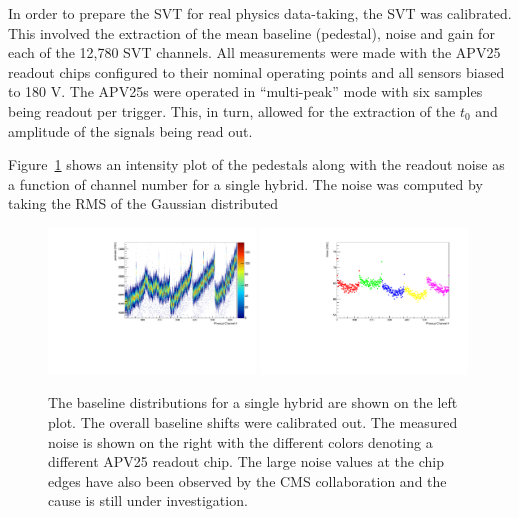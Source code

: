 
%
%

In order to prepare the SVT for real physics data-taking, the SVT was 
calibrated. This involved the extraction of the mean baseline (pedestal),
noise and gain for each of the 12,780 SVT channels. All measurements
were made with the APV25 readout chips configured to their nominal operating
points \cite{Jones:1069892} and all sensors biased to 180 V. The APV25s were
operated in ``multi-peak'' mode with six samples being readout per trigger.
This, in turn, allowed for the extraction of the $t_0$ and amplitude of the 
signals being read out.

Figure~\ref{fig:pedestal_noise} shows an intensity plot of the pedestals 
along with the readout noise as a function of channel number for a single
hybrid.  The noise was computed by taking the RMS of the Gaussian distributed
\begin{figure}[h]
    \begin{center}
    	\includegraphics[width=0.49\textwidth]{test2012/svtperformance/svt_calib/baseline_v_ch_fpga0_hybrid0.pdf}
    	\includegraphics[width=0.49\textwidth]{test2012/svtperformance/svt_calib/noise_v_ch_fpga0_hybrid0_0.pdf}
        \caption{The baseline distributions for a single hybrid are shown on
                 the left plot. The overall baseline shifts were calibrated 
                 out. The measured noise is shown on the right with the 
                 different colors denoting a different APV25 readout chip.  
                 The large noise values at the chip edges have also been 
                 observed by the CMS collaboration and the cause is still 
                 under investigation.
                 } 
	\label{fig:pedestal_noise}
    \end{center}
\end{figure}
